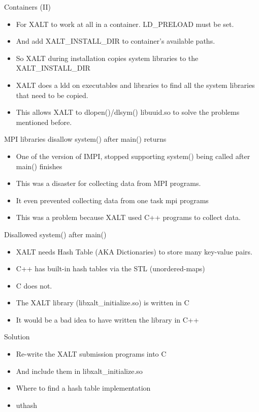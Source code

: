 \documentclass{beamer}
\begin{document}
\begin{frame}{Containers (II)}
  \begin{itemize}
    \item For XALT to work at all in a container. LD\_PRELOAD must be
      set.
    \item And add XALT\_INSTALL\_DIR to container's available paths.
    \item So XALT during installation copies system libraries to the
      XALT\_INSTALL\_DIR
    \item XALT does a ldd on executables and libraries to find all the
      system libraries that need to be copied.
    \item This allows XALT to dlopen()/dlsym() libuuid.so to solve the
      problems mentioned before.
  \end{itemize}
\end{frame}


\begin{frame}{MPI libraries disallow system() after main() returns}
  \begin{itemize}
    \item One of the version of IMPI, stopped supporting system()
      being called after main() finishes
    \item This was a disaster for collecting data from MPI programs.
    \item It even prevented collecting data from one task mpi programs
    \item This was a problem because XALT used C++ programs to collect data.
  \end{itemize}
\end{frame}

\begin{frame}{Disallowed system() after main()}
  \begin{itemize}
    \item XALT needs Hash Table (AKA Dictionaries) to store many
      key-value pairs.
    \item C++ has built-in hash tables via the STL (unordered-maps)
    \item C does not.
    \item The XALT library (libxalt\_initialize.so) is written in C
    \item It would be a bad idea to have written the library in C++
  \end{itemize}
\end{frame}

\begin{frame}{Solution}
  \begin{itemize}
    \item Re-write the XALT submission programs into C
    \item And include them in libxalt\_initialize.so
    \item Where to find a hash table implementation
    \item uthash
  \end{itemize}
\end{frame}
\end{document}

